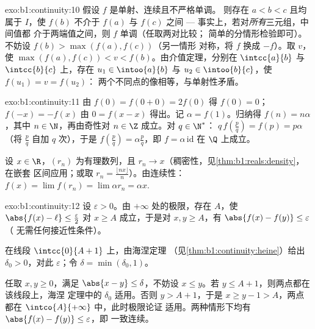 \begin{solution}{exo:b1:continuity:10}
假设 $f$ 是单射、连续且不严格单调。
则存在 $a < b < c$ 且均属于 $I$，使 $f(b)$ 不介于 $f(a)$ 与
$f(c)$ 之间 --- 事实上，若对\emph{所有}三元组，中间值都
介于两端值之间，则 $f$ 单调（任取两对比较；
简单的分情形检验即可）。不妨设 $f(b) > \max(f(a), f(c))$（另一情形
对称，将 $f$ 换成 $-f$）。取 $v$，使 $\max(f(a),
f(c)) < v < f(b)$。由介值定理，分别在
$\intcc{a}{b}$ 与 $\intcc{b}{c}$ 上，存在 $u_1 \in
\intoo{a}{b}$ 与 $u_2 \in \intoo{b}{c}$，使 $f(u_1) = v = f(u_2)$：
两个不同点的像相等，与单射性矛盾。
\end{solution}

\begin{solution}{exo:b1:continuity:11}
由 $f(0) = f(0+0) = 2f(0)$ 得 $f(0) = 0$；$f(-x) = -f(x)$ 由 $0 =
f(x - x)$ 得出。记 $\alpha = f(1)$。归纳得 $f(n) = n\alpha$，其中 $n
\in \N$，再由奇性对 $n \in \Z$ 成立。对 $q \in \N^*$：
$q\,f(\frac pq) = f(p) = p\alpha$（将 $\frac pq$ 自加 $q$
次），于是 $f(\frac pq) = \alpha\frac pq$，即 $f = \alpha\,
\mathrm{id}$ 在 $\Q$ 上成立。

设 $x \in \R$，$(r_n)$ 为有理数列，且 $r_n \to
x$（稠密性，见\cref{thm:b1:reals:density}，在嵌套
区间应用；或取 $r_n = \frac{\lfloor nx\rfloor}{n}$）。由连续性：
$f(x) = \lim f(r_n) = \lim \alpha r_n = \alpha x$.
\end{solution}

\begin{solution}{exo:b1:continuity:12}
设 $\varepsilon > 0$。由 $+\infty$ 处的极限，存在 $A$，使
$\abs{f(x) - \ell} \leq \frac\varepsilon2$ 对 $x \geq A$ 成立，于是对
$x, y \geq A$，有 $\abs{f(x) - f(y)} \leq \varepsilon$（
无需任何接近性条件）。

在线段 $\intcc{0}{A + 1}$ 上，由海涅定理
（见\cref{thm:b1:continuity:heine}）给出 $\delta_0 > 0$，对此
$\varepsilon$；令 $\delta = \min(\delta_0, 1)$。

任取 $x, y \geq 0$，满足 $\abs{x - y} \leq \delta$，不妨设 $x
\leq y$。若 $y \leq A + 1$，则两点都在该线段上，海涅
定理中的 $\delta_0$ 适用。否则 $y > A + 1$，于是 $x \geq y - 1 >
A$，两点都在 $\intco{A}{+\infty}$ 中，此时极限论证
适用。两种情形下均有 $\abs{f(x) - f(y)} \leq \varepsilon$，即
一致连续。
\end{solution}

